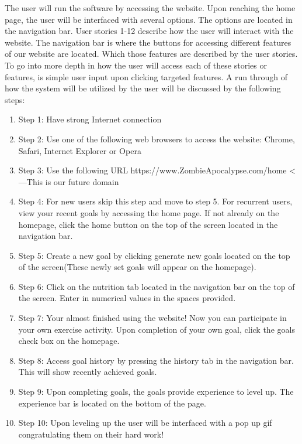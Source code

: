 \documentclass[a4paper]{article}
\begin{document}
\noindent  The user will run the software by accessing the website. Upon reaching the home page, the user will be interfaced with several options. The options are located in the navigation bar. User stories 1-12 describe how the user will interact with the website. The navigation bar is where the buttons for accessing different features of our website are located. Which those features are described by the user stories. To go into more depth in how the user will access each of these stories or features, is simple user input upon clicking targeted features. A run through of how the system will be utilized by the user will be discussed by the following steps:
\newline
\begin{enumerate}
\item Step 1: Have strong Internet connection
\item Step 2: Use one of the following web browsers to access the website: Chrome, Safari, Internet Explorer or Opera
\item Step 3: Use the following URL https://www.ZombieApocalypse.com/home <---This is our future domain
\item Step 4: For new users skip this step and move to step 5. For recurrent users, view your recent goals by accessing the home page. If not already on the homepage, click the home button on the top of the screen located in the navigation bar. 
\item Step 5: Create a new goal by clicking generate new goals located on the top of the screen(These newly set goals will appear on the homepage).
\item Step 6: Click on the nutrition tab located in the navigation bar on the top of the screen. Enter in numerical values in the spaces provided. 
\item Step 7: Your almost finished using the website! Now you can participate in your own exercise activity. Upon completion of your own goal, click the goals check box on the homepage. 
\item Step 8: Access goal history by pressing the history tab in the navigation bar. This will show recently achieved goals.
\item Step 9: Upon completing goals, the goals provide experience to level up. The experience bar is located on the bottom of the page. 
\item Step 10: Upon leveling up the user will be interfaced with a pop up gif congratulating them on their hard work!
\end{enumerate}
\end{document}
